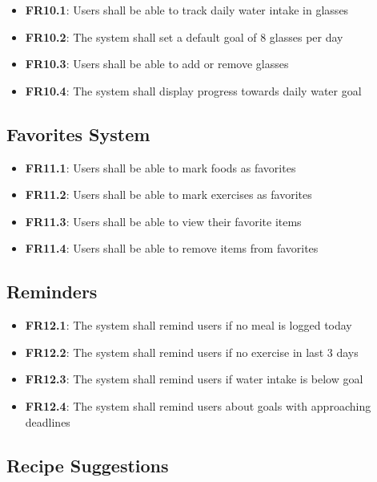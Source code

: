 \begin{itemize}
    \item \textbf{FR10.1}: Users shall be able to track daily water intake in glasses
    \item \textbf{FR10.2}: The system shall set a default goal of 8 glasses per day
    \item \textbf{FR10.3}: Users shall be able to add or remove glasses
    \item \textbf{FR10.4}: The system shall display progress towards daily water goal
\end{itemize}

\subsection{Favorites System}

\begin{itemize}
    \item \textbf{FR11.1}: Users shall be able to mark foods as favorites
    \item \textbf{FR11.2}: Users shall be able to mark exercises as favorites
    \item \textbf{FR11.3}: Users shall be able to view their favorite items
    \item \textbf{FR11.4}: Users shall be able to remove items from favorites
\end{itemize}

\subsection{Reminders}

\begin{itemize}
    \item \textbf{FR12.1}: The system shall remind users if no meal is logged today
    \item \textbf{FR12.2}: The system shall remind users if no exercise in last 3 days
    \item \textbf{FR12.3}: The system shall remind users if water intake is below goal
    \item \textbf{FR12.4}: The system shall remind users about goals with approaching deadlines
\end{itemize}

\subsection{Recipe Suggestions}

